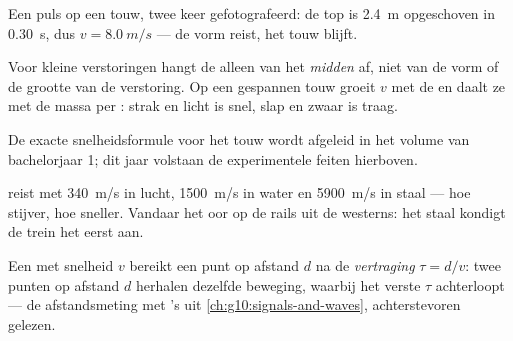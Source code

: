 \begin{omfigure}

{\small Een puls op een touw, twee keer gefotografeerd: de top is
\qty{2.4}{m} opgeschoven in \qty{0.30}{s}, dus $v = \qty{8.0}{m/s}$ ---
de vorm reist, het touw blijft.}
\end{omfigure}

\begin{proposition}\label{prop:g12:mechanical-waves:medium}
Voor kleine verstoringen hangt de  alleen van het
\emph{midden} af, niet van de vorm of de grootte van de verstoring. Op een
gespannen touw groeit $v$ met de  en daalt ze met de massa per
: strak en licht is snel, slap en zwaar is traag. \admitted
\end{proposition}

\begin{remark}\label{rem:g12:mechanical-waves:ropeformula}
De exacte snelheidsformule voor het touw wordt afgeleid in het volume van
bachelorjaar 1; dit jaar volstaan de experimentele feiten hierboven.
\end{remark}

\begin{example}[Geluidssnelheden]\label{ex:g12:mechanical-waves:speeds}
 reist met \qty{340}{m/s} in lucht, \qty{1500}{m/s} in water en
\qty{5900}{m/s} in staal --- hoe stijver, hoe sneller. Vandaar het oor op
de rails uit de westerns: het staal kondigt de trein het eerst aan.
\end{example}

\begin{definition}[Vertraging]\label{def:g12:mechanical-waves:delay}
Een  met snelheid $v$ bereikt een punt op afstand $d$ na de
\emph{vertraging} $\tau = d/v$: twee punten op afstand
$d$ herhalen dezelfde beweging, waarbij het verste $\tau$ achterloopt ---
de afstandsmeting met 's uit \cref{ch:g10:signals-and-waves},
achterstevoren gelezen.
\end{definition}

